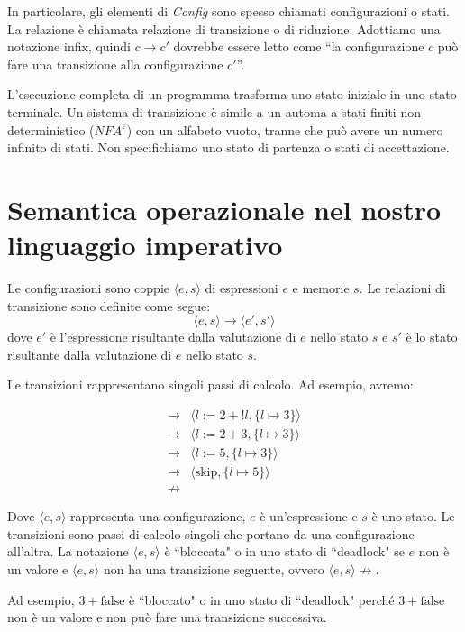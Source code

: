In particolare, gli elementi di \textit{Config} sono spesso chiamati configurazioni
o stati. La relazione è chiamata relazione di transizione o di riduzione. Adottiamo
una notazione infix, quindi \(c \rightarrow c'\) dovrebbe essere letto come ``la
configurazione \(c\) può fare una transizione alla configurazione \(c'\)''.

L'esecuzione completa di un programma trasforma uno stato iniziale in uno
stato terminale. Un sistema di transizione è simile a un automa a stati
finiti non deterministico ($\textit{NFA}^\varepsilon$) con un alfabeto vuoto,
tranne che può
avere un numero infinito di stati. Non specifichiamo uno stato di partenza o stati
di accettazione.

\section{Semantica operazionale nel nostro linguaggio imperativo}
Le configurazioni sono coppie $\langle e, s\rangle$ di espressioni $e$ e memorie $s$.
Le relazioni di transizione sono definite come segue:
\[
  \langle e, s \rangle \rightarrow \langle e', s' \rangle
\]
dove $e'$ è l'espressione risultante dalla valutazione di $e$ nello stato $s$ e
$s'$ è lo stato risultante dalla valutazione di $e$ nello stato $s$.

Le transizioni rappresentano singoli passi di calcolo. Ad esempio, avremo:

\[
\begin{array}{ll}
\rightarrow & \langle l:=2+!l, \{l \mapsto 3\} \rangle \\
\rightarrow & \langle l:=2+3, \{l \mapsto 3\} \rangle \\
\rightarrow & \langle l:=5, \{l \mapsto 3\} \rangle \\
\rightarrow & \langle \text{skip}, \{l \mapsto 5\} \rangle \\
\not \rightarrow & 
\end{array}
\]

Dove \(\langle e, s \rangle\) rappresenta una configurazione, \(e\) è
un'espressione e \(s\) è uno stato. Le transizioni sono passi di calcolo
singoli che portano da una configurazione all'altra. La notazione
\(\langle e, s \rangle\) è ``bloccata" o in uno stato di ``deadlock"
se \(e\) non è un valore e \(\langle e, s \rangle\) non ha una transizione
seguente, ovvero \(\langle e, s \rangle \not\rightarrow \).

Ad esempio, \(3 + \text{false}\) è ``bloccato" o in uno stato di ``deadlock"
perché \(3 + \text{false}\) non è un valore e non può fare una transizione successiva.
